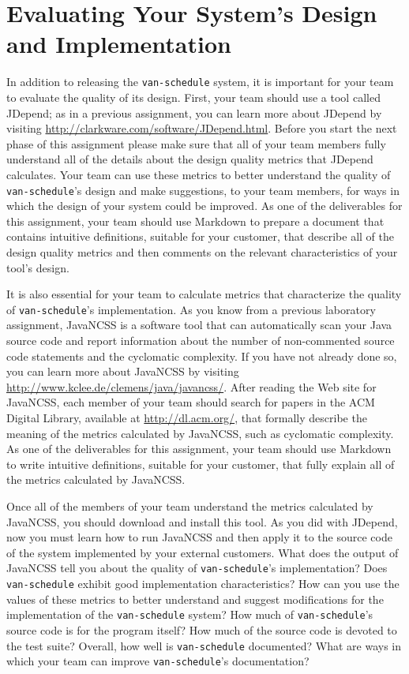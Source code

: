 \section*{Evaluating Your System's Design and Implementation}

In addition to releasing the {\tt van-schedule} system, it is important for your team to evaluate the quality of its
design.  First, your team should use a tool called JDepend; as in a previous assignment, you can learn more about
JDepend by visiting \url{http://clarkware.com/software/JDepend.html}.  Before you start the next phase of this
assignment please make sure that all of your team members fully understand all of the details about the design quality
metrics that JDepend calculates.  Your team can use these metrics to better understand the quality of {\tt
van-schedule}'s design and make suggestions, to your team members, for ways in which the design of your system could be
improved.  As one of the deliverables for this assignment, your team should use Markdown to prepare a document that
contains intuitive definitions, suitable for your customer, that describe all of the design quality metrics and then
comments on the relevant characteristics of your tool's design.

It is also essential for your team to calculate metrics that characterize the quality of {\tt van-schedule}'s
implementation.  As you know from a previous laboratory assignment, JavaNCSS is a software tool that can automatically
scan your Java source code and report information about the number of non-commented source code statements and the
cyclomatic complexity.  If you have not already done so, you can learn more about JavaNCSS by visiting
\url{http://www.kclee.de/clemens/java/javancss/}. After reading the Web site for JavaNCSS, each member of your team
should search for papers in the ACM Digital Library, available at \url{http://dl.acm.org/}, that formally describe the
meaning of the metrics calculated by JavaNCSS, such as cyclomatic complexity. As one of the deliverables for this
assignment, your team should use Markdown to write intuitive definitions, suitable for your customer, that fully explain
all of the metrics calculated by JavaNCSS.

Once all of the members of your team understand the metrics calculated by JavaNCSS, you should download and install this
tool.  As you did with JDepend, now you must learn how to run JavaNCSS and then apply it to the source code of the
system implemented by your external customers.  What does the output of JavaNCSS tell you about the quality of
{\tt van-schedule}'s implementation? Does {\tt van-schedule} exhibit good implementation characteristics? How can you use the
values of these metrics to better understand and suggest modifications for the implementation of the {\tt van-schedule}
system? How much of {\tt van-schedule}'s source code is for the program itself? How much of the source code is devoted to the
test suite?  Overall, how well is {\tt van-schedule} documented? What are ways in which your team can improve {\tt van-schedule}'s
documentation?

